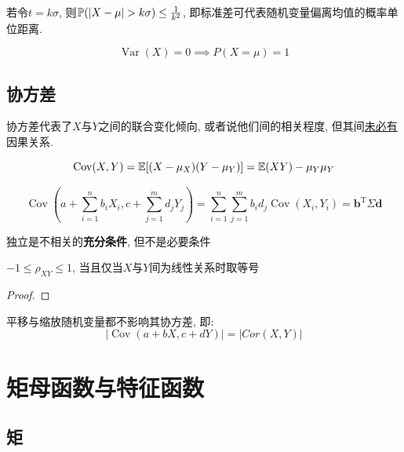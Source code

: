 \begin{remark}
    若令$t=k\sigma$, 则$\P(\left| X-\mu \right| >k\sigma)\le \frac{1}{k^{2}}$, 即标准差可代表随机变量偏离均值的概率单位距离.
\end{remark}

\begin{corollary}
    \[ \operatorname{Var}(X)=0 \implies P(X=\mu)=1 \]
\end{corollary}

\subsection{协方差}

协方差代表了$X$与$Y$之间的联合变化倾向, 或者说他们间的相关程度, 但其间\underline{未必有}因果关系.

\begin{theorem}
    \[ \operatorname{Cov} (X,Y)=\E[(X-\mu_X)(Y-\mu_Y)]=\E(XY)-\mu_Y \mu_Y \]
\end{theorem}

\begin{theorem}
    \[ \operatorname{Cov}(a+\sum_{i=1}^n b_i X_i,c+\sum_{j=1}^m d_j Y_j) = \sum_{i=1}^n\sum_{j=1}^m b_i d_j \operatorname{Cov}(X_i,Y_i) = \mathbf{b}^{\mathrm{T}}\Sigma \mathbf{d}\]
\end{theorem}

\begin{theorem}
    独立是不相关的\textbf{充分条件}, 但不是必要条件
\end{theorem}

\begin{theorem}
    $-1\le \rho_{XY} \le 1$, 当且仅当$X$与$Y$间为线性关系时取等号
\end{theorem}

\begin{proof}
\end{proof}

\begin{theorem}
    平移与缩放随机变量都不影响其协方差, 即:
    \[ \left| \operatorname{Cov}(a+ b X,c +d Y) \right| = \left| Cor(X,Y) \right|  \]
\end{theorem}

\section{矩母函数与特征函数}

\subsection{矩}

